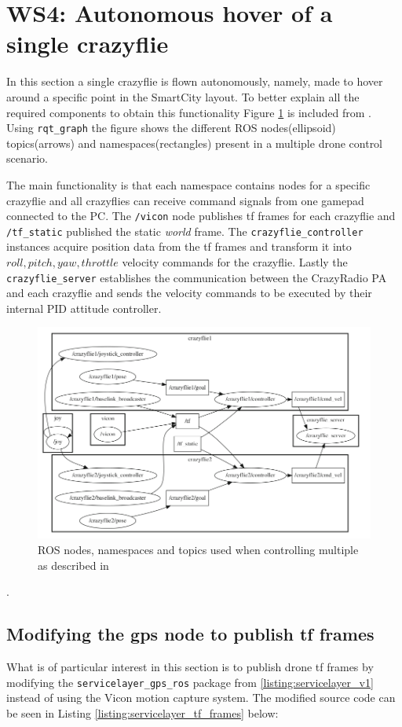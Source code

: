 \section{WS4: Autonomous hover of a single crazyflie}
In this section a single crazyflie is flown autonomously, namely, made to hover around a specific point in the SmartCity layout. To better explain all the required components to obtain this functionality Figure \ref{figure:hoenig_topics} is included from \cite{HoenigMixedReality2015}. Using \texttt{rqt\_graph} the figure shows the different ROS nodes(ellipsoid) topics(arrows) and namespaces(rectangles) present in a multiple drone control scenario.

The main functionality is that each namespace contains nodes for a specific crazyflie and all crazyflies can receive command signals from one gamepad connected to the PC. The \texttt{/vicon} node publishes tf frames for each crazyflie and \texttt{/tf\_static} published the static \textit{world} frame. The \texttt{crazyflie\_controller} instances acquire position data from the tf frames and transform it into $roll, pitch, yaw, throttle$ velocity commands for the crazyflie. Lastly the \texttt{crazyflie\_server} establishes the communication between the CrazyRadio PA and each crazyflie and sends the velocity commands to be executed by their internal PID attitude controller.

\begin{figure}[H]
\centering
 \includegraphics[scale=0.5]{Figures/hoenig_topics.png}
 \caption{ROS nodes, namespaces and topics used when controlling multiple as described in \cite{HoenigMixedReality2015}}
 \label{figure:hoenig_topics}
\end{figure}.

\subsection{Modifying the gps node to publish tf frames}
\label{section:servicelayer_gps_final}
\noindent What is of particular interest in this section is to publish drone tf frames by modifying the \texttt{servicelayer\_gps\_ros} package from \ref{listing:servicelayer_v1} instead of using the Vicon motion capture system. The modified source code can be seen in Listing \ref{listing:servicelayer_tf_frames} below:

